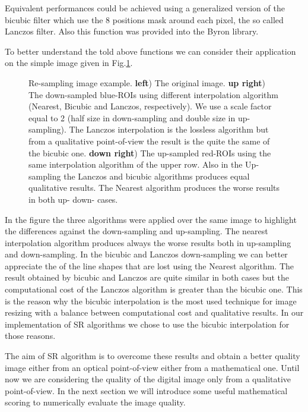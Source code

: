 \documentclass{standalone}
\begin{document}
Equivalent performances could be achieved using a generalized version of the bicubic filter which use the 8 positions mask around each pixel, the so called Lanczos filter.
Also this function was provided into the Byron library.

To better understand the told above functions we can consider their application on the simple image given in Fig.\ref{fig:resampling}.

\begin{figure}[htbp]
\centering
\def\svgwidth{\textwidth}

\caption{Re-sampling image example.
\textbf{left}) The original image.
\textbf{up right}) The down-sampled blue-ROIs using different interpolation algorithm (Nearest, Bicubic and Lanczos, respectively).
We use a scale factor equal to 2 (half size in down-sampling and double size in up-sampling).
The Lanczos interpolation is the lossless algorithm but from a qualitative point-of-view the result is the quite the same of the bicubic one.
\textbf{down right}) The up-sampled red-ROIs using the same interpolation algorithm of the upper row.
Also in the Up-sampling the Lanczos and bicubic algorithms produces equal qualitative results.
The Nearest algorithm produces the worse results in both up- down- cases.
}
\label{fig:resampling}
\end{figure}

In the figure the three algorithms were applied over the same image to highlight the differences against the down-sampling and up-sampling.
The nearest interpolation algorithm produces always the worse results both in up-sampling and down-sampling.
In the bicubic and Lanczos down-sampling we can better appreciate the  of the line shapes that are lost using the Nearest algorithm.
The result obtained by bicubic and Lanczos are quite similar in both cases but the computational cost of the Lanczos algorithm is greater than the bicubic one.
This is the reason why the bicubic interpolation is the most used technique for image resizing with a balance between computational cost and qualitative results.
In our implementation of SR algorithms we chose to use the bicubic interpolation for those reasons.

The aim of SR algorithm is to overcome these results and obtain a better quality image either from an optical point-of-view either from a mathematical one.
Until now we are considering the quality of the digital image only from a qualitative point-of-view.
In the next section we will introduce some useful mathematical scoring to numerically evaluate the image quality.
\end{document}
